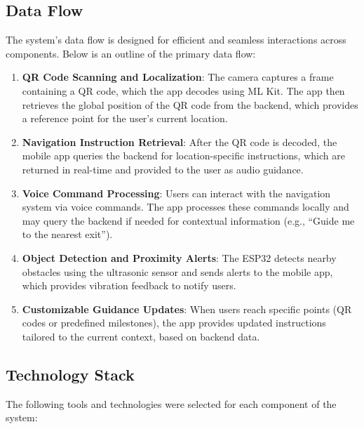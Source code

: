 \subsection{Data Flow}

The system’s data flow is designed for efficient and seamless interactions across components. Below is an outline of the primary data flow:

\begin{enumerate}
	\item \textbf{QR Code Scanning and Localization}: The camera captures a frame containing a QR code, which the app decodes using ML Kit. The app then retrieves the global position of the QR code from the backend, which provides a reference point for the user’s current location.
	\item \textbf{Navigation Instruction Retrieval}: After the QR code is decoded, the mobile app queries the backend for location-specific instructions, which are returned in real-time and provided to the user as audio guidance.
	\item \textbf{Voice Command Processing}: Users can interact with the navigation system via voice commands. The app processes these commands locally and may query the backend if needed for contextual information (e.g., “Guide me to the nearest exit”).
	\item \textbf{Object Detection and Proximity Alerts}: The ESP32 detects nearby obstacles using the ultrasonic sensor and sends alerts to the mobile app, which provides vibration feedback to notify users.
	\item \textbf{Customizable Guidance Updates}: When users reach specific points (QR codes or predefined milestones), the app provides updated instructions tailored to the current context, based on backend data.
\end{enumerate}

\subsection{Technology Stack}

The following tools and technologies were selected for each component of the system:

